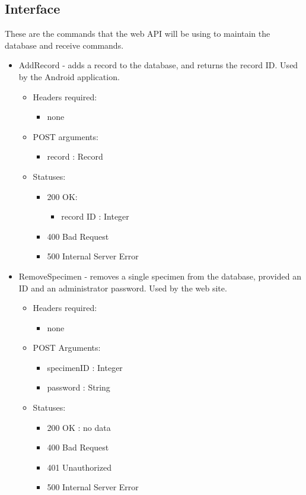 \subsection{Interface}
    These are the commands that the web API will be using to maintain the database and receive commands.
    \begin{itemize}
        \item AddRecord - adds a record to the database, and returns the record ID. Used by the Android application.
        \begin{itemize}
        \item Headers required:
        \begin{itemize}
            \item none
        \end{itemize}
        \item POST arguments:
        \begin{itemize}
            \item record : Record
        \end{itemize}
        \item Statuses:
        \begin{itemize}
        	\item 200 OK:
            \begin{itemize}
        		\item record ID : Integer
            \end{itemize}
        	\item 400 Bad Request
        	\item 500 Internal Server Error
        \end{itemize}
	    \end{itemize}
    

        \item RemoveSpecimen - removes a single specimen from the database, provided an ID and an administrator password. Used by the web site.
        \begin{itemize}
        \item Headers required: 
        \begin{itemize}
        	\item none
        \end{itemize}
        \item POST Arguments:
        \begin{itemize}
        	\item specimenID : Integer
        	\item password : String
        \end{itemize}
        \item Statuses:
        \begin{itemize}
        	\item 200 OK : no data
        	\item 400 Bad Request
        	\item 401 Unauthorized
        	\item 500 Internal Server Error
        \end{itemize}
	    \end{itemize}


\end{itemize}
